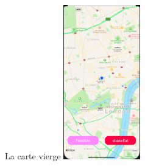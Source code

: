     \begin{frame}{La carte vierge}
        \centering
        \includegraphics[width = 0.25\textwidth]{images/map-vierge.png}
    \end{frame}
   
